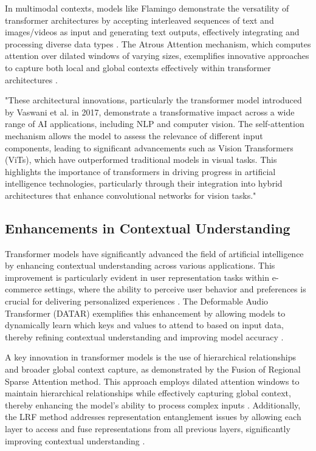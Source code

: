 In multimodal contexts, models like Flamingo demonstrate the versatility of transformer architectures by accepting interleaved sequences of text and images/videos as input and generating text outputs, effectively integrating and processing diverse data types \cite{alayrac2022flamingo}. The Atrous Attention mechanism, which computes attention over dilated windows of varying sizes, exemplifies innovative approaches to capture both local and global contexts effectively within transformer architectures \cite{ibtehaz2024fusionregionalsparseattention}.



"These architectural innovations, particularly the transformer model introduced by Vaswani et al. in 2017, demonstrate a transformative impact across a wide range of AI applications, including NLP and computer vision. The self-attention mechanism allows the model to assess the relevance of different input components, leading to significant advancements such as Vision Transformers (ViTs), which have outperformed traditional models in visual tasks. This highlights the importance of transformers in driving progress in artificial intelligence technologies, particularly through their integration into hybrid architectures that enhance convolutional networks for vision tasks." \cite{chitale2023taskarithmeticloracontinual,kasneci2023chatgpt,timagetran3}



\subsection{Enhancements in Contextual Understanding} \label{subsec:Enhancements in Contextual Understanding}

Transformer models have significantly advanced the field of artificial intelligence by enhancing contextual understanding across various applications. This improvement is particularly evident in user representation tasks within e-commerce settings, where the ability to perceive user behavior and preferences is crucial for delivering personalized experiences \cite{ni2018perceiveusersdepthlearning}. The Deformable Audio Transformer (DATAR) exemplifies this enhancement by allowing models to dynamically learn which keys and values to attend to based on input data, thereby refining contextual understanding and improving model accuracy \cite{zhu2024deformableaudiotransformeraudio}.



A key innovation in transformer models is the use of hierarchical relationships and broader global context capture, as demonstrated by the Fusion of Regional Sparse Attention method. This approach employs dilated attention windows to maintain hierarchical relationships while effectively capturing global context, thereby enhancing the model's ability to process complex inputs \cite{ibtehaz2024fusionregionalsparseattention}. Additionally, the LRF method addresses representation entanglement issues by allowing each layer to access and fuse representations from all previous layers, significantly improving contextual understanding \cite{zheng2023layerwiserepresentationfusioncompositional}.



